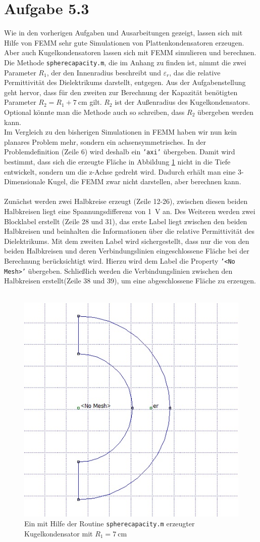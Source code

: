 \section{Aufgabe 5.3}
Wie in den vorherigen Aufgaben und Ausarbeitungen gezeigt, lassen sich mit Hilfe von FEMM sehr gute Simulationen von Plattenkondensatoren erzeugen. Aber auch Kugelkondensatoren lassen sich mit FEMM simulieren und berechnen. \\
Die Methode \texttt{spherecapacity.m}, die im Anhang zu finden ist, nimmt die zwei Parameter $R_1$, der den Innenradius beschreibt und $\varepsilon_r$, das die relative Permittivität des Dielektrikums darstellt, entgegen. Aus der Aufgabenstellung geht hervor, dass für den zweiten zur Berechnung der Kapazität benötigten Parameter $R_2 = R_1 + \SI{7}{\centi\meter}$ gilt. $R_2$ ist der Außenradius des Kugelkondensators. Optional könnte man die Methode auch so schreiben, dass $R_2$ übergeben werden kann.\\
Im Vergleich zu den bisherigen Simulationen in FEMM haben wir nun kein planares Problem mehr, sondern ein achsensymmetrisches. In der Problemdefinition (Zeile 6) wird deshalb ein \texttt{'axi'} übergeben. Damit wird bestimmt, dass sich die erzeugte Fläche in Abbildung \ref{fig:KK} nicht in die Tiefe entwickelt, sondern um die z-Achse gedreht wird. Dadurch erhält man eine 3-Dimensionale Kugel, die FEMM zwar nicht darstellen, aber berechnen kann.\\ \\
Zunächst werden zwei Halbkreise erzeugt (Zeile 12-26), zwischen diesen beiden Halbkreisen liegt eine Spannungsdifferenz von \SI{1}{\volt} an. Des Weiteren werden zwei Blocklabel erstellt (Zeile 28 und 31), das erste Label liegt zwischen den beiden Halbkreisen und beinhalten die Informationen über die relative Permittivität des Dielektrikums. Mit dem zweiten Label wird sichergestellt, dass nur die von den beiden Halbkreisen und deren Verbindungslinien eingeschlossene Fläche bei der Berechnung berücksichtigt wird. Hierzu wird dem Label die Property \texttt{'<No Mesh>'} übergeben. Schließlich werden die Verbindungslinien zwischen den Halbkreisen erstellt(Zeile 38 und 39), um eine abgeschlossene Fläche zu erzeugen. \\ \\
\begin{figure}[h]
	\centering
	\includegraphics[width=.45\textwidth]{data/Kugelkondensator}
	\caption{Ein mit Hilfe der Routine \texttt{spherecapacity.m} erzeugter Kugelkondensator mit $R_1 = \SI{7}{\centi\meter}$ }
	\label{fig:KK}
\end{figure}

